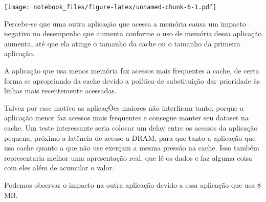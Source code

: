 \documentclass[
]{article}
\newenvironment{Shaded}{\begin{snugshade}}{\end{snugshade}}
\newcommand{\DataTypeTok}[1]{\textcolor[rgb]{0.13,0.29,0.53}{#1}}
\newcommand{\DecValTok}[1]{\textcolor[rgb]{0.00,0.00,0.81}{#1}}
\newcommand{\KeywordTok}[1]{\textcolor[rgb]{0.13,0.29,0.53}{\textbf{#1}}}
\newcommand{\NormalTok}[1]{#1}
\newcommand{\OperatorTok}[1]{\textcolor[rgb]{0.81,0.36,0.00}{\textbf{#1}}}
\newcommand{\StringTok}[1]{\textcolor[rgb]{0.31,0.60,0.02}{#1}}
\begin{document}
\begin{Shaded}
\end{Shaded}

\texttt{[image: notebook\_files/figure-latex/unnamed-chunk-6-1.pdf]}

Percebe-se que uma outra aplicação que acessa a memória causa um impacto
negativo no desempenho que aumenta conforme o uso de memória dessa
aplicação aumenta, até que ela atinge o tamanho da cache ou o tamanho da
primeira aplicação.

A aplicação que usa menos memória faz acessos mais frequentes a cache,
de certa forma se apropriando da cache devido a política de substituição
dar prioridade às linhas mais recentemente acessadas.

Talvez por esse motivo as aplicaçÕes maiores não interfiram tanto,
porque a aplicação menor faz acessos mais frequentes e consegue manter
seu dataset na cache. Um teste interessante seria colocar um delay entre
os acessos da aplicação pequena, próximo a latência de acesso a DRAM,
para que tanto a aplicação que usa cache quanto a que não use exerçam a
mesma pressão na cache. Isso também representaria melhor uma
apresentação real, que lê os dados e faz alguma coisa com eles além de
acumular o valor.

Podemos observar o impacto na outra aplicação devido a essa aplicação
que usa 8 MB.
\end{document}
